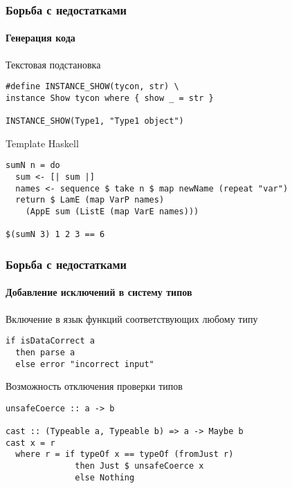 \documentclass[ucs]{beamer}
\begin{document}

\begin{frame}[fragile]
  \frametitle{Борьба с недостатками}
  \framesubtitle{Генерация кода}

  \begin{block}{Текстовая подстановка}
\begin{verbatim}
#define INSTANCE_SHOW(tycon, str) \
instance Show tycon where { show _ = str }

INSTANCE_SHOW(Type1, "Type1 object")
\end{verbatim}
  \end{block}

  \begin{block}{Template Haskell}
\begin{verbatim}
sumN n = do
  sum <- [| sum |]
  names <- sequence $ take n $ map newName (repeat "var")
  return $ LamE (map VarP names)
    (AppE sum (ListE (map VarE names)))

$(sumN 3) 1 2 3 == 6
\end{verbatim}
  \end{block}
\end{frame}

\begin{frame}[fragile]
  \frametitle{Борьба с недостатками}
  \framesubtitle{Добавление исключений в систему типов}

  \begin{block}{Включение в язык функций соответствующих любому типу}
\begin{verbatim}
if isDataCorrect a
  then parse a
  else error "incorrect input"
\end{verbatim}
  \end{block}

  \begin{block}{Возможность отключения проверки типов}
\begin{verbatim}
unsafeCoerce :: a -> b

cast :: (Typeable a, Typeable b) => a -> Maybe b
cast x = r
  where r = if typeOf x == typeOf (fromJust r)
              then Just $ unsafeCoerce x
              else Nothing
\end{verbatim}
  \end{block}
\end{frame}

\end{document}
